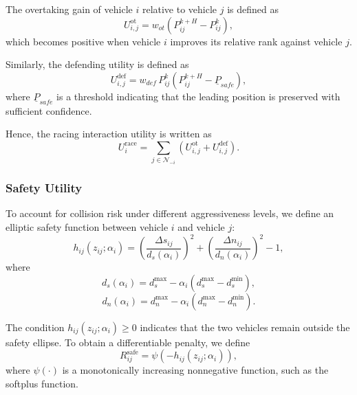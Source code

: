 \documentclass[final ,3p, times]{elsarticle}
\begin{document}
The overtaking gain of vehicle $i$ relative to vehicle $j$ is defined as
\begin{equation}
U_{i,j}^{\mathrm{ot}}
=
w_{ot}\left( P_{ij}^{k+H} - P_{ij}^k \right),
\label{eq:overtake_gain}
\end{equation}
which becomes positive when vehicle $i$ improves its relative rank against vehicle $j$.

Similarly, the defending utility is defined as
\begin{equation}
U_{i,j}^{\mathrm{def}}
=
w_{def}\,
P_{ij}^{k}
\left( P_{ij}^{k+H} - \underline P_{safe} \right),
\label{eq:defense_gain}
\end{equation}
where $\underline P_{safe}$ is a threshold indicating that the leading position is preserved with sufficient confidence.

Hence, the racing interaction utility is written as
\begin{equation}
U_i^{\mathrm{race}}
=
\sum_{j \in \mathcal{N}_{-i}}
\left(
U_{i,j}^{\mathrm{ot}} + U_{i,j}^{\mathrm{def}}
\right).
\label{eq:racing_interaction_utility}
\end{equation}

\subsubsection{Safety Utility}

To account for collision risk under different aggressiveness levels, we define an elliptic safety function between vehicle $i$ and vehicle $j$:
\begin{equation}
h_{ij}(z_{ij};\alpha_i)
=
\left( \frac{\Delta s_{ij}}{d_s(\alpha_i)} \right)^2
+
\left( \frac{\Delta n_{ij}}{d_n(\alpha_i)} \right)^2
-1,
\label{eq:elliptic_safety_function}
\end{equation}
where
\begin{equation}
d_s(\alpha_i)=d_s^{\max}-\alpha_i\left(d_s^{\max}-d_s^{\min}\right),
\label{eq:longitudinal_safety_scale}
\end{equation}
\begin{equation}
d_n(\alpha_i)=d_n^{\max}-\alpha_i\left(d_n^{\max}-d_n^{\min}\right).
\label{eq:lateral_safety_scale}
\end{equation}

The condition $h_{ij}(z_{ij};\alpha_i)\ge 0$ indicates that the two vehicles remain outside the safety ellipse. To obtain a differentiable penalty, we define
\begin{equation}
R_{ij}^{\mathrm{safe}}
=
\psi\!\left(-h_{ij}(z_{ij};\alpha_i)\right),
\label{eq:safety_penalty}
\end{equation}
where $\psi(\cdot)$ is a monotonically increasing nonnegative function, such as the softplus function.
\end{document}
